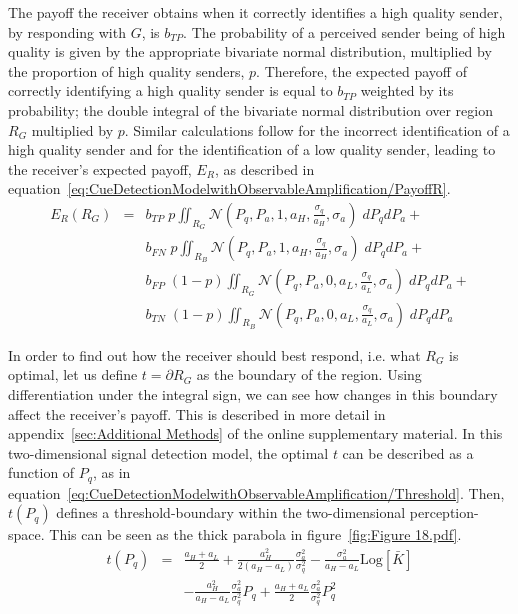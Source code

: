 \documentclass[a4paper,12pt]{article}
\numberwithin{equation}{section}
\numberwithin{figure}{section}
\begin{document}
The payoff the receiver obtains when it correctly identifies a high quality sender, by responding with $G$, is $b_{TP}$. The probability of a perceived sender being of high quality is given by the appropriate bivariate normal distribution, multiplied by the proportion of high quality senders, $p$. Therefore, the expected payoff of correctly identifying a high quality sender is equal to $b_{TP}$ weighted by its probability; the double integral of the bivariate normal distribution over region $R_{G}$ multiplied by $p$. Similar calculations follow for the incorrect identification of a high quality sender and for the identification of a low quality sender, leading to the receiver's expected payoff, $E_{R}$, as described in equation~\ref{eq:CueDetectionModelwithObservableAmplification/PayoffR}.
\begin{equation}
\label{eq:CueDetectionModelwithObservableAmplification/PayoffR}
\begin{array}{rcl}
E_{R}(R_{G}) &=& b_{TP} \; p \displaystyle \iint_{R_{G}} \mathcal{N}(P_{q}, P_{a}, 1, a_{H}, \frac{\sigma_{q}}{a_{H}}, \sigma_{a}) \; dP_{q}dP_{a} +\\
&&b_{FN} \; p \displaystyle \iint_{R_{B}} \mathcal{N}(P_{q}, P_{a}, 1, a_{H}, \frac{\sigma_{q}}{a_{H}}, \sigma_{a}) \; dP_{q}dP_{a} +\\
&&b_{FP} \; (1-p) \displaystyle \iint_{R_{G}} \mathcal{N}(P_{q}, P_{a}, 0, a_{L}, \frac{\sigma_{q}}{a_{L}}, \sigma_{a}) \; dP_{q}dP_{a} +\\
&&b_{TN} \; (1-p) \displaystyle \iint_{R_{B}} \mathcal{N}(P_{q}, P_{a}, 0, a_{L}, \frac{\sigma_{q}}{a_{L}}, \sigma_{a}) \; dP_{q}dP_{a}
\end{array}
\end{equation}

In order to find out how the receiver should best respond, i.e. what $R_{G}$ is optimal, let us define $t=\partial R_{G}$ as the boundary of the region. Using differentiation under the integral sign, we can see how changes in this boundary affect the receiver's payoff. This is described in more detail in appendix~\ref{sec:Additional Methods} of the online supplementary material. In this two-dimensional signal detection model, the optimal $t$ can be described as a function of $P_{q}$, as in equation~\ref{eq:CueDetectionModelwithObservableAmplification/Threshold}. Then, $t(P_{q})$ defines a threshold-boundary within the two-dimensional perception-space. This can be seen as the thick parabola in figure~\ref{fig:Figure 18.pdf}.
\begin{equation}
\label{eq:CueDetectionModelwithObservableAmplification/Threshold}
\begin{array}{rcl}
t(P_{q})&=&\displaystyle \frac{a_{H} + a_{L}}{2} + \frac{a_{H}^{2}}{2 (a_{H} - a_{L})} \frac{\sigma_{a}^{2}}{\sigma_{q}^{2}} - \frac{\sigma_{a}^{2}}{a_{H} - a_{L}} \text{Log} [\bar{K}] \\
&&-\displaystyle \frac{a_{H}^2}{a_{H} - a_{L}} \frac{\sigma_{a}^2}{\sigma_{q}^2} P_{q} + \frac{a_{H}+a_{L}}{2} \frac{\sigma_{a}^2}{\sigma_{q}^2} P_{q}^{2}
\end{array}
\end{equation}
\end{document}
